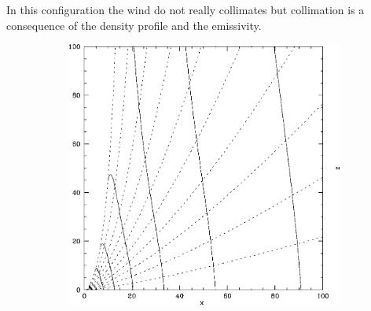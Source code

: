 \documentclass[10pt,a4paper,english]{article}
\begin{document}
In this configuration the wind do not really collimates but collimation is a
consequence of the density profile and the emissivity.

\begin{figure}[!ht]
  \begin{subfigure}[t]{0.645\columnwidth}
    \includegraphics[width=\columnwidth]{figures/shang1998-1.png}
  \end{subfigure}
  \begin{subfigure}[t]{0.345\columnwidth}

\end{subfigure}
\end{figure}
\end{document}
